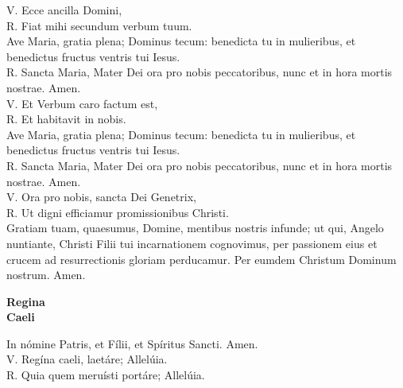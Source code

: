 \documentclass[letterpaper, landscape, 10pt, twocolumn]{article}
\begin{document}
  \noindent
  {\color{red} V. E}cce ancilla Domini,\\
  {\color{red} R. F}iat mihi secundum verbum tuum.\\

  \noindent
  {\color{red} A}ve Maria, gratia plena; Dominus tecum: benedicta tu in mulieribus, et benedictus fructus ventris tui Iesus.\\
  {\color{red} R. S}ancta Maria, Mater Dei ora pro nobis peccatoribus, nunc et in hora mortis nostrae. {\color{red} A}men.\\

  \noindent
  {\color{red} V. E}t Verbum caro factum est,\\
  {\color{red} R. E}t habitavit in nobis.\\

  \noindent
  {\color{red} A}ve Maria, gratia plena; Dominus tecum: benedicta tu in mulieribus, et benedictus fructus ventris tui Iesus.\\
  {\color{red} R. S}ancta Maria, Mater Dei ora pro nobis peccatoribus, nunc et in hora mortis nostrae. {\color{red} A}men.\\

  \noindent
  {\color{red} V. O}ra pro nobis, sancta Dei Genetrix,\\
  {\color{red} R. U}t digni efficiamur promissionibus Christi.\\

  \noindent
  {\color{red} G}ratiam tuam, quaesumus, Domine, mentibus nostris infunde; ut qui, Angelo nuntiante, Christi Filii tui incarnationem cognovimus, per passionem eius et crucem ad resurrectionis gloriam perducamur. Per eumdem Christum Dominum nostrum. {\color{red} A}men.\\
  \vfill

  \begin{center}
    {\fontsize{50pt}{60pt}\selectfont \textbf{Regina\\ Caeli}}\\
  \end{center}
  \vspace{1cm}

  \noindent
  \Large {\color{red} I}n nómine Patris, et Fílii, et Spíritus Sancti. {\color{red} A}men.\\

  \noindent
  \normalsize
  {\color{red} V. R}egína caeli, laetáre; {\color{red} A}llelúia.\\
  {\color{red} R. Q}uia quem meruísti portáre; {\color{red} A}llelúia.\\
\end{document}
